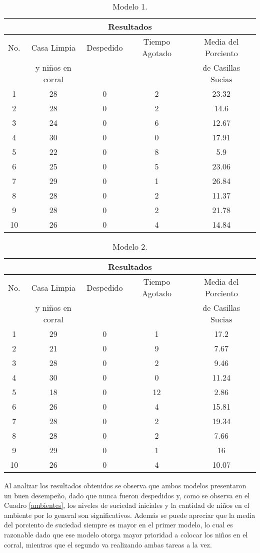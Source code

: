 \documentclass[12pt,a4paper]{article}
\begin{document}
\begin{table}[htb]
	\centering
	\begin{tabular}{|c|c|c|c|c|}
		\hline
		\multicolumn{5}{|c|}{Resultados} \\ \hline
		No. & Casa Limpia  & Despedido & Tiempo Agotado & Media del Porciento  \\
		 &  y ni\~nos en corral &  &  &  de Casillas Sucias\\
		\hline
		1 & 28 & 0 & 2 & 23.32 \\
		\hline
		2 & 28 & 0 & 2 & 14.6 \\
		\hline
		3 & 24 & 0 & 6 & 12.67 \\ 
		\hline
		4 & 30 & 0 & 0 & 17.91 \\
		\hline
		5 & 22 & 0 & 8 & 5.9 \\
		\hline
		6 & 25 & 0 & 5 & 23.06 \\
		\hline
		7 & 29 & 0 & 1 & 26.84 \\
		\hline
		8 & 28 & 0 & 2 & 11.37 \\
		\hline
		9 & 28 & 0 & 2 & 21.78 \\
		\hline
		10 & 26 & 0 & 4 & 14.84 \\
		\hline
	\end{tabular}
	\caption{Modelo 1.}
	\label{modelo1}
\end{table}

\newpage

\begin{table}[htb]
	\centering
	\begin{tabular}{|c|c|c|c|c|}
	\hline
	\multicolumn{5}{|c|}{Resultados} \\ \hline
	No. & Casa Limpia  & Despedido & Tiempo Agotado & Media del Porciento  \\
	&  y ni\~nos en corral &  &  &  de Casillas Sucias\\
	\hline
	1 & 29 & 0 & 1 & 17.2 \\
	\hline
	2 & 21 & 0 & 9 & 7.67 \\
	\hline
	3 & 28 & 0 & 2 & 9.46 \\ 
	\hline
	4 & 30 & 0 & 0 & 11.24 \\
	\hline
	5 & 18 & 0 & 12 & 2.86 \\
	\hline
	6 & 26 & 0 & 4 & 15.81 \\
	\hline
	7 & 28 & 0 & 2 & 19.34 \\
	\hline
	8 & 28 & 0 & 2 & 7.66 \\
	\hline
	9 & 29 & 0 & 1 & 16 \\
	\hline
	10 & 26 & 0 & 4 & 10.07 \\
	\hline
\end{tabular}
	\caption{Modelo 2.}
	\label{modelo2}
\end{table}
	
Al analizar los resultados obtenidos se observa que ambos modelos presentaron un buen desempe\~no, dado que nunca fueron despedidos y, como se observa en el Cuadro \ref{ambientes}, los niveles de suciedad iniciales y la cantidad de ni\~nos en el ambiente por lo general son significativos. 
Adem\'as se puede apreciar que la media del porciento de suciedad siempre es mayor en el primer modelo, lo cual es razonable dado que ese modelo otorga mayor prioridad a colocar los ni\~nos en el corral, mientras que el segundo va realizando ambas tareas a la vez.  	
\end{document}
